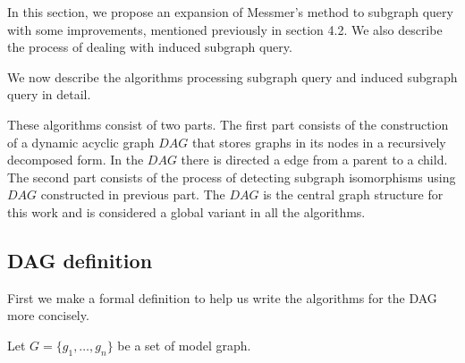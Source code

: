 In this section, we propose an expansion of Messmer's method to subgraph query with some improvements, mentioned previously in section 4.2.
We also describe the process of dealing with induced subgraph query.

We now describe the algorithms processing subgraph query and induced subgraph query in detail.

These algorithms consist of two parts. The first part consists of the construction of a dynamic acyclic graph $DAG$ that stores graphs in its nodes 
in a recursively decomposed form. In the $DAG$ there is directed a edge from a parent to a child. The second part consists of the process of 
detecting subgraph isomorphisms using $DAG$ constructed in previous part. The $DAG$ is the central graph structure for this work and is considered  a global variant in all the algorithms. 

\subsection{DAG definition}
First we make a formal definition to help us write the algorithms for the DAG more concisely.

Let $G=\{g_1 ,\ldots, g_n \}$ be a set of model graph. 


